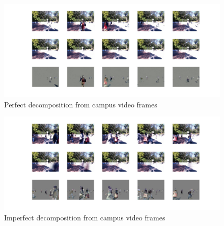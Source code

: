 \begin{figure}[h]
  \centering
  \includegraphics[width=1\textwidth]{../figures/campus_capture1.pdf}
  \caption{Perfect decomposition from campus video frames}
  \label{fig:video:campus:capture1}
\end{figure}

\begin{figure}[h]
  \centering
  \includegraphics[width=1\textwidth]{../figures/campus_capture2.pdf}
  \caption{Imperfect decomposition from campus video frames}
  \label{fig:video:campus:capture2}
\end{figure}

